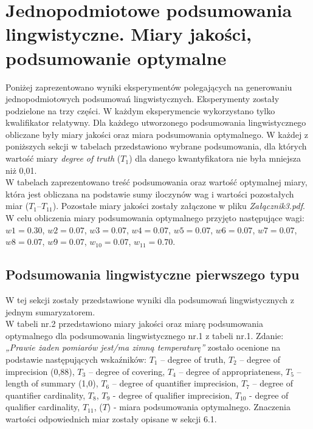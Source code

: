 \documentclass{article}
\begin{document}
\section{ Jednopodmiotowe podsumowania lingwistyczne. Miary jakości, podsumowanie optymalne}
Poniżej zaprezentowano wyniki eksperymentów polegających na generowaniu jednopodmiotowych podsumowań lingwistycznych. Eksperymenty zostały podzielone na trzy części. W każdym eksperymencie wykorzystano tylko kwalifikator relatywny. Dla każdego utworzonego podsumowania lingwistycznego obliczane były miary jakości oraz miara podsumowania optymalnego. W każdej z poniższych sekcji w tabelach przedstawiono wybrane podsumowania, dla których wartość miary \textit{degree of truth} (\(T_1\)) dla danego kwantyfikatora nie była mniejsza niż 0{,}01. \\
W tabelach zaprezentowano treść podsumowania oraz wartość optymalnej miary, która jest obliczana na podstawie sumy iloczynów wag i wartości pozostałych miar (\(T_1\)–\(T_{11}\)). Pozostałe miary jakości zostały załączone w pliku \textit{Załącznik3.pdf}. W celu obliczenia miary podsumowania optymalnego przyjęto następujące wagi: \(w1 = 0.30\), \(w2 = 0.07\), \(w3 = 0.07\), \(w4 = 0.07\), \(w5 = 0.07\), \(w6 = 0.07\), \(w7 = 0.07\), \(w8 = 0.07\), \(w9 = 0.07\), \(w_{10} = 0.07\), \(w_{11} = 0.70\).


\subsection{Podsumowania lingwistyczne pierwszego typu}
W tej sekcji zostały przedstawione wyniki dla podsumowań lingwistycznych z jednym sumaryzatorem.\\
W tabeli nr.2 przedstawiono miary jakości oraz miarę podsumowania optymalnego dla podsumowania lingwistycznego nr.1 z tabeli nr.1. Zdanie: \textit{„Prawie żaden pomiarów jest/ma zimną temperaturę”} zostało ocenione na podstawie następujących wskaźników: \(T_1\) – degree of truth, \(T_2\) – degree of imprecision (0{,}88), \(T_3\) – degree of covering, \(T_4\) – degree of appropriateness, \(T_5\) – length of summary (1{,}0), \(T_6\) – degree of quantifier imprecision, \(T_7\) – degree of quantifier cardinality, \(T_8\), \(T_9\) - degree of qualifier imprecision, \(T_{10}\) - degree of qualifier cardinality, \(T_{11}\), (\(T\)) - miara podsumowania optymalnego. Znaczenia wartości odpowiednich miar zostały opisane w sekcji 6.1.
\end{document}
